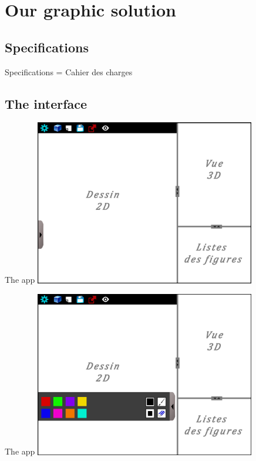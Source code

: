 \documentclass[a4paper,10pt]{beamer}
\begin{document}
	\section{Our graphic solution}
		\subsection{Specifications}
		
		\begin{frame}{Specifications}
			= Cahier des charges
		\end{frame}
		
		\subsection{The interface}
		
			\begin{frame}{The app}
				\includegraphics[height=205pt]{images/AppliMenuFerme.png}
			\end{frame}
			
			\begin{frame}{The app}
				\includegraphics[height=205pt]{images/AppliMenuOuvert.png}
			\end{frame}
			
\end{document}

